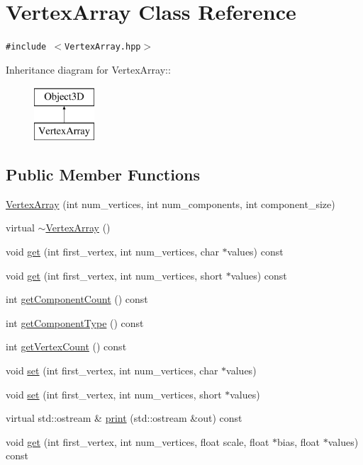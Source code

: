 \hypertarget{classm3g_1_1VertexArray}{
\section{VertexArray Class Reference}
\label{classm3g_1_1VertexArray}
}
{\tt \#include $<$VertexArray.hpp$>$}

Inheritance diagram for VertexArray::\begin{figure}[H]
\begin{center}
\leavevmode
\includegraphics[height=2cm]{classm3g_1_1VertexArray}
\end{center}
\end{figure}
\subsection*{Public Member Functions}
\begin{CompactItemize}
\item 
\hyperlink{classm3g_1_1VertexArray_5f38e30d23b5dc34b223e749e8afd0d0}{VertexArray} (int num\_\-vertices, int num\_\-components, int component\_\-size)
\item 
virtual \hyperlink{classm3g_1_1VertexArray_267fa63cb2f4216729437dc826415911}{$\sim$VertexArray} ()
\item 
void \hyperlink{classm3g_1_1VertexArray_9d1b801a7c196a07553a5ef4a5473573}{get} (int first\_\-vertex, int num\_\-vertices, char $\ast$values) const 
\item 
void \hyperlink{classm3g_1_1VertexArray_575822f60d7b5e74ed51e94851123038}{get} (int first\_\-vertex, int num\_\-vertices, short $\ast$values) const 
\item 
int \hyperlink{classm3g_1_1VertexArray_7016f51d2788e78fdd736efd040f5e5e}{getComponentCount} () const 
\item 
int \hyperlink{classm3g_1_1VertexArray_9b7b78fbff0603779ec6bdd2a323c939}{getComponentType} () const 
\item 
int \hyperlink{classm3g_1_1VertexArray_c1c9b7f5b0dcd9c0310d7e77e10081ba}{getVertexCount} () const 
\item 
void \hyperlink{classm3g_1_1VertexArray_501a9e6d9b5190b0a9dbfe58a6fd9d2e}{set} (int first\_\-vertex, int num\_\-vertices, char $\ast$values)
\item 
void \hyperlink{classm3g_1_1VertexArray_ac10afe01263d9ac5e7f972a7263de4a}{set} (int first\_\-vertex, int num\_\-vertices, short $\ast$values)
\item 
virtual std::ostream \& \hyperlink{classm3g_1_1VertexArray_6fea17fa1532df3794f8cb39cb4f911f}{print} (std::ostream \&out) const 
\item 
void \hyperlink{classm3g_1_1VertexArray_1adedf59e0c6a047242a3914ca52b929}{get} (int first\_\-vertex, int num\_\-vertices, float scale, float $\ast$bias, float $\ast$values) const 
\end{CompactItemize}
